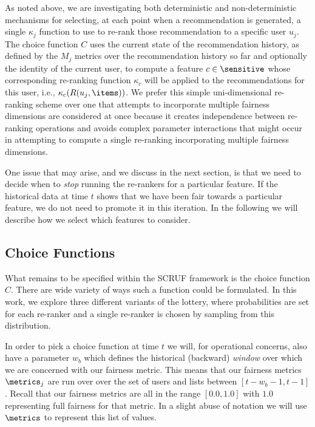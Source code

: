 As noted above, we are investigating both deterministic and non-deterministic mechanisms for selecting, at each point when a recommendation is generated, a single $\kappa_j$ function to use to re-rank those recommendation to a specific user $u_j$. The choice function $C$ uses the current state of the recommendation history, as defined by the $M_j$ metrics over the recommendation history so far and optionally the identity of the current user, to compute a feature $c \in \sensitive$  whose corresponding re-ranking function $\kappa_c$ will be applied to the recommendations for this user, i.e., $\kappa_c(R(u_j, \items))$. We prefer this simple uni-dimensional re-ranking scheme over one that attempts to incorporate multiple fairness dimensions are considered at once because it creates independence between re-ranking operations and avoids complex parameter interactions that might occur in attempting to compute a single re-ranking incorporating multiple fairness dimensions.

One issue that may arise, and we discuss in the next section, is that we need to decide when to \emph{stop} running the re-rankers for a particular feature. If the historical data at time $t$ shows that we have been fair towards a particular feature, we do not need to promote it in this iteration. In the following we will describe how we select which features to consider.

\subsection{Choice Functions}

What remains to be specified within the SCRUF framework is the choice function $C$. There are wide variety of ways such a function could be formulated. In this work, we explore three different variants of the lottery, where probabilities are set for each re-ranker and a single re-ranker is chosen by sampling from this distribution.

In order to pick a choice function at time $t$ we will, for operational concerns, also have a parameter $w_b$ which defines the historical (backward) \emph{window} over which we are concerned with our fairness metric.  This means that our fairness metrics $\metrics_j$ are run over over the set of users and lists between $[t - w_b - 1, t-1]$.  Recall that our fairness metrics are all in the range $[0.0, 1.0]$ with $1.0$ representing full fairness for that metric.  In a slight abuse of notation we will use $\metrics$ to represent this list of values.

